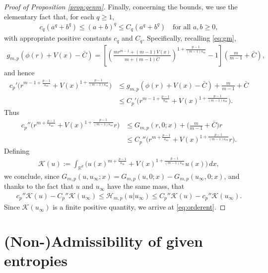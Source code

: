 \documentclass[reqno]{amsart}
\newcommand{\R}{\mathbb{R}}
\newcommand{\Rd}{{\R^d}}
\newcommand{\intRd}{{\int_\Rd}}
\begin{document}
\begin{proof}[Proof of Proposition \ref{prop:genm}]
    Finally, concerning the bounds, we use the elementary fact that, for each $q\ge1$,
    \begin{align*}
        c_q(a^q+b^q)\le(a+b)^q\le C_q(a^q+b^q) \quad \text{for all $a,b\ge0$},
    \end{align*}
    with appropriate positive constants $c_q$ and $C_q$. Specifically, recalling \eqref{eq:gm},
    \begin{align*}
        g_{m,p}(\phi(r)+V(x)-\bar C) 
        = \left[\left(\frac{mr^{m-1}+(m-1)V(x)}{m+(m-1)\bar C}\right)^{1+\frac{p-1}{(m-1)\kappa_m}}-1 \right]\left(\frac{m}{m-1}+\bar C\right),
    \end{align*}
    and hence
    \begin{align*}
        c_p'\Big(r^{m-1+\frac{p-1}{\kappa_m}}+V(x)^{1+\frac{p-1}{(m-1)\kappa_m}}\Big)&\le g_{m,p}(\phi(r)+V(x)-\bar C)+\frac{m}{m-1}+\bar C\\
        &\le C_p'\Big(r^{m-1+\frac{p-1}{\kappa_m}}+V(x)^{1+\frac{p-1}{(m-1)\kappa_m}}\Big).
    \end{align*}
    Thus
    \begin{align*}
        c_p''\Big(r^{m+\frac{p-1}{\kappa_m}}+V(x)^{1+\frac{p-1}{(m-1)\kappa_m}}r\Big) &\le G_{m,p}(r,0;x)+\big(\frac{m}{m-1}+\bar C\big)r\\
        &\le C_p''\Big(r^{m+\frac{p-1}{\kappa_m}}+V(x)^{1+\frac{p-1}{(m-1)\kappa_m}}r\Big).
    \end{align*}
    Defining
    \begin{align*}
        \mathcal{K}(u) := \intRd \Big(u(x)^{m+\frac{p-1}{\kappa_m}}+V(x)^{1+\frac{p-1}{(m-1)\kappa_m}}u(x)\Big)\,dx,
    \end{align*}
    we conclude, since $G_{m,p}(u,u_\infty;x) = G_{m,p}(u,0;x)-G_{m,p}(u_\infty,0;x)$, and thanks to the fact that $u$ and $u_\infty$ have the same mass, that
    \begin{align*}
        c_p''
        \mathcal{K}(u) - C_p''\mathcal{K}(u_\infty) \le \mathcal H_{m,p}(u|u_\infty) \le C_p''\mathcal{K}(u) - c_p''\mathcal{K}(u_\infty).
    \end{align*}
    Since $\mathcal{K}(u_\infty)$ is a finite positive quantity, we arrive at \eqref{eq:orderent}.
 \end{proof}






\section{(Non-)Admissibility of given entropies}\label{sec:entropygivennonlin}
\setcounter{equation}{0}
\end{document}
